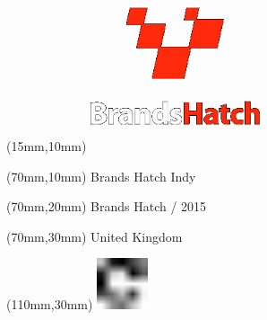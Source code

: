 \null\newpage
\begin{textblock*}{50mm}(15mm,10mm)%
\includegraphics[width=50mm]{LG/BRH.png}
\end{textblock*}
\begin{textblock*}{130mm}(70mm,10mm)%
{\fontsize{20}{20}\selectfont Brands Hatch Indy}\\
\end{textblock*}
\begin{textblock*}{120mm}(70mm,20mm)%
{\fontsize{16}{16}\selectfont Brands Hatch / 2015}\\
\end{textblock*}
\begin{textblock*}{120mm}(70mm,30mm)%
{\fontsize{12}{12}\selectfont United Kingdom}
\end{textblock*}
\begin{textblock*}{30mm}(110mm,30mm)%
\centering
\includegraphics[height=15mm]{icons/fa-rotate-right.pdf}
\end{textblock*}
